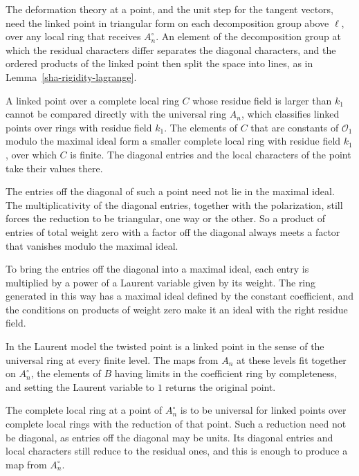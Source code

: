 The deformation theory at a point, and the unit step for the tangent vectors, need the linked point in triangular form on each decomposition group above $\ell$, over any local ring that receives $A_n^\circ$. An element of the decomposition group at which the residual characters differ separates the diagonal characters, and the ordered products of the linked point then split the space into lines, as in Lemma~\ref{sha-rigidity-lagrange}.

A linked point over a complete local ring $C$ whose residue field is larger than $k_1$ cannot be compared directly with the universal ring $A_n$, which classifies linked points over rings with residue field $k_1$. The elements of $C$ that are constants of $\mathcal O_1$ modulo the maximal ideal form a smaller complete local ring with residue field $k_1$, over which $C$ is finite. The diagonal entries and the local characters of the point take their values there.

The entries off the diagonal of such a point need not lie in the maximal ideal. The multiplicativity of the diagonal entries, together with the polarization, still forces the reduction to be triangular, one way or the other. So a product of entries of total weight zero with a factor off the diagonal always meets a factor that vanishes modulo the maximal ideal.

To bring the entries off the diagonal into a maximal ideal, each entry is multiplied by a power of a Laurent variable given by its weight. The ring generated in this way has a maximal ideal defined by the constant coefficient, and the conditions on products of weight zero make it an ideal with the right residue field.

In the Laurent model the twisted point is a linked point in the sense of the universal ring at every finite level. The maps from $A_n$ at these levels fit together on $A_n^\circ$, the elements of $B$ having limits in the coefficient ring by completeness, and setting the Laurent variable to $1$ returns the original point.

The complete local ring at a point of $A_n^\circ$ is to be universal for linked points over complete local rings with the reduction of that point. Such a reduction need not be diagonal, as entries off the diagonal may be units. Its diagonal entries and local characters still reduce to the residual ones, and this is enough to produce a map from $A_n^\circ$.

